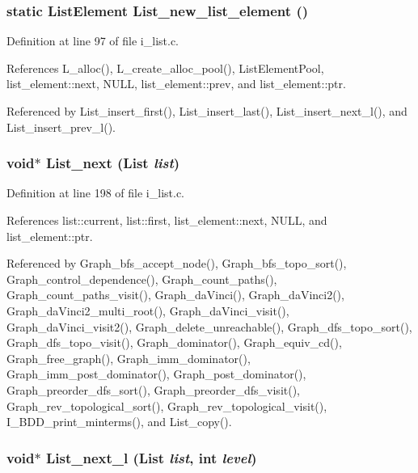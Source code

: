 \subsubsection{\setlength{\rightskip}{0pt plus 5cm}static \bf{List\-Element} List\_\-new\_\-list\_\-element ()\hspace{0.3cm}{\tt  [static]}}\label{i__list_8c_23b6ac26b401e9249020bd4e6b49f923}




Definition at line 97 of file i\_\-list.c.

References L\_\-alloc(), L\_\-create\_\-alloc\_\-pool(), List\-Element\-Pool, list\_\-element::next, NULL, list\_\-element::prev, and list\_\-element::ptr.

Referenced by List\_\-insert\_\-first(), List\_\-insert\_\-last(), List\_\-insert\_\-next\_\-l(), and List\_\-insert\_\-prev\_\-l().
\subsubsection{\setlength{\rightskip}{0pt plus 5cm}void$\ast$ List\_\-next (\bf{List} {\em list})}\label{i__list_8c_1bd9d17aaca24a47c41146981c5e05cd}




Definition at line 198 of file i\_\-list.c.

References list::current, list::first, list\_\-element::next, NULL, and list\_\-element::ptr.

Referenced by Graph\_\-bfs\_\-accept\_\-node(), Graph\_\-bfs\_\-topo\_\-sort(), Graph\_\-control\_\-dependence(), Graph\_\-count\_\-paths(), Graph\_\-count\_\-paths\_\-visit(), Graph\_\-da\-Vinci(), Graph\_\-da\-Vinci2(), Graph\_\-da\-Vinci2\_\-multi\_\-root(), Graph\_\-da\-Vinci\_\-visit(), Graph\_\-da\-Vinci\_\-visit2(), Graph\_\-delete\_\-unreachable(), Graph\_\-dfs\_\-topo\_\-sort(), Graph\_\-dfs\_\-topo\_\-visit(), Graph\_\-dominator(), Graph\_\-equiv\_\-cd(), Graph\_\-free\_\-graph(), Graph\_\-imm\_\-dominator(), Graph\_\-imm\_\-post\_\-dominator(), Graph\_\-post\_\-dominator(), Graph\_\-preorder\_\-dfs\_\-sort(), Graph\_\-preorder\_\-dfs\_\-visit(), Graph\_\-rev\_\-topological\_\-sort(), Graph\_\-rev\_\-topological\_\-visit(), I\_\-BDD\_\-print\_\-minterms(), and List\_\-copy().
\subsubsection{\setlength{\rightskip}{0pt plus 5cm}void$\ast$ List\_\-next\_\-l (\bf{List} {\em list}, int {\em level})}\label{i__list_8c_0b78cd5706f1d3cd6650091e59741d8b}




